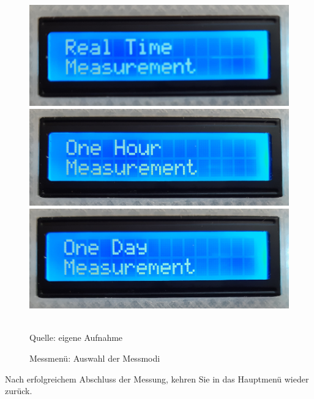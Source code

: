 \begin{figure}[!hbt]
	\centering
	\begin{minipage}[t]{0.3\linewidth}
		\centering
		\includegraphics[width=\linewidth]{Images/RealTime2}
	\end{minipage}
	\hfill
	\begin{minipage}[t]{0.3\linewidth}
		\centering
		\includegraphics[width=\linewidth]{Images/OneHour2}
	\end{minipage}
	\hfill
	\begin{minipage}[t]{0.3\linewidth}
		\centering
		\includegraphics[width=\linewidth]{Images/OneDay2}	
	\end{minipage}
	\footnotesize \\Quelle: eigene Aufnahme
	\caption{Messmenü: Auswahl der Messmodi}
	\label{fig:messmodi}
\end{figure}

Nach erfolgreichem Abschluss der Messung, kehren Sie in das Hauptmenü wieder zurück.